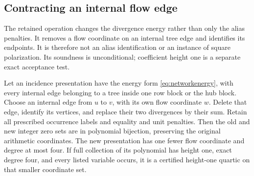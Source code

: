 \subsection{Contracting an internal flow edge}
The retained operation changes the divergence energy rather than only the
alias penalties. It removes a flow coordinate on an internal tree edge
and identifies its endpoints. It is therefore not an alias identification
or an instance of square polarization. Its soundness is unconditional;
coefficient height one is a separate exact acceptance test.

\begin{theorem}\label{thm:contraction}
Let an incidence presentation have the energy form
\eqref{eq:networkenergy}, with every internal edge belonging to a tree
inside one row block or the hub block. Choose an internal edge from $u$
to $v$, with its own flow coordinate $w$. Delete that edge, identify its
vertices, and replace their two divergences by their sum. Retain all
prescribed occurrence labels and equality and unit penalties. Then the
old and new integer zero sets are in polynomial bijection, preserving
the original arithmetic coordinates. The new presentation has one fewer
flow coordinate and degree at most four. If full collection of its
polynomial has height one, exact degree four, and every listed variable
occurs, it is a certified height-one quartic on that smaller coordinate set.
\end{theorem}
